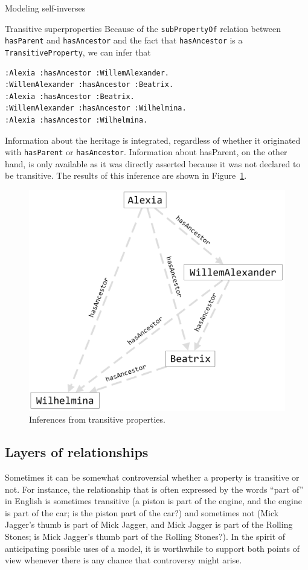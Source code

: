 \begin{challenge}{Modeling self-inverses}
\begin{challenge}{Transitive superproperties}
Because of the \texttt{subPropertyOf} relation between \texttt{hasParent} and \texttt{hasAncestor}
and the fact that
\texttt{hasAncestor} is a \texttt{TransitiveProperty}, we can infer that

\begin{lstlisting}
:Alexia :hasAncestor :WillemAlexander.
:WillemAlexander :hasAncestor :Beatrix.
:Alexia :hasAncestor :Beatrix.
:WillemAlexander :hasAncestor :Wilhelmina.
:Alexia :hasAncestor :Wilhelmina.
\end{lstlisting}

Information about the heritage is integrated, regardless of whether it
originated with \texttt{hasParent} or \texttt{hasAncestor}. Information about hasParent,
on the other hand, is only available as it was directly asserted because
it was not declared to be transitive. The results of this inference are
shown in Figure~\ref{fig:ch9.4}.
\end{challenge}

\begin{figure}
\centering
\includegraphics[width=5in]{SWWOv3/media/ch9/figure9-4.png}
\caption{Inferences from transitive properties.}
\label{fig:ch9.4}
\end{figure}



\subsection{Layers of relationships}

Sometimes it can be somewhat controversial whether a property is
transitive or not. For instance, the relationship that is often
expressed by the words ``part of'' in English is sometimes transitive (a
piston is part of the engine, and the engine is part of the car; is the
piston part of the car?) and sometimes not (Mick Jagger's thumb is part
of Mick Jagger, and Mick Jagger is part of the Rolling Stones; is Mick
Jagger's thumb part of the Rolling Stones?). In the spirit of
anticipating possible uses of a model, it is worthwhile to support both
points of view whenever there is any chance that controversy might
arise.


\end{challenge}
